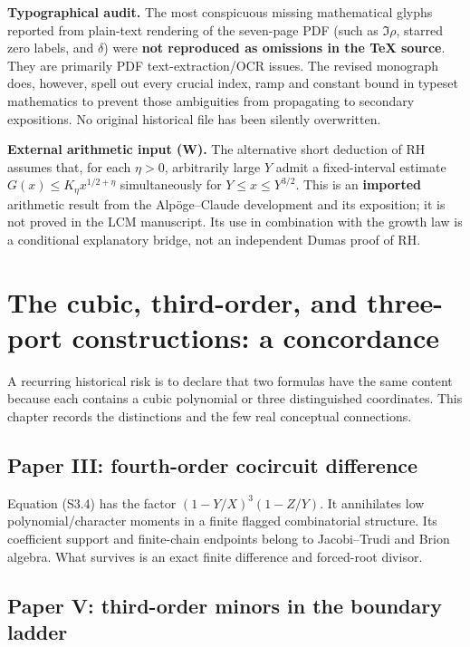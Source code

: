\documentclass[
  10pt,
  a4paper,
  10pt,
  oneside,
  openany]{book}
\begin{document}
\textbf{Typographical audit.} The most conspicuous missing mathematical
glyphs reported from plain-text rendering of the seven-page PDF (such as
\(\Im\rho\), starred zero labels, and \(\delta\)) were \textbf{not
reproduced as omissions in the TeX source}. They are primarily PDF
text-extraction/OCR issues. The revised monograph does, however, spell
out every crucial index, ramp and constant bound in typeset mathematics
to prevent those ambiguities from propagating to secondary expositions.
No original historical file has been silently overwritten.

\textbf{External arithmetic input (W).} The alternative short deduction
of RH assumes that, for each \(\eta>0\), arbitrarily large \(Y\) admit a
fixed-interval estimate \(G(x)\le K_\eta x^{1/2+\eta}\) simultaneously
for \(Y\le x\le Y^{3/2}\). This is an \textbf{imported} arithmetic
result from the Alpöge--Claude development and its exposition; it is not
proved in the LCM manuscript. Its use in combination with the growth law
is a conditional explanatory bridge, not an independent Dumas proof of
RH.

\section{The cubic, third-order, and three-port constructions: a
concordance}\label{the-cubic-third-order-and-three-port-constructions-a-concordance}

A recurring historical risk is to declare that two formulas have the
same content because each contains a cubic polynomial or three
distinguished coordinates. This chapter records the distinctions and the
few real conceptual connections.

\subsection{Paper III: fourth-order cocircuit
difference}\label{paper-iii-fourth-order-cocircuit-difference}

Equation (S3.4) has the factor \((1-Y/X)^3(1-Z/Y)\). It annihilates low
polynomial/character moments in a finite flagged combinatorial
structure. Its coefficient support and finite-chain endpoints belong to
Jacobi--Trudi and Brion algebra. What survives is an exact finite
difference and forced-root divisor.

\subsection{Paper V: third-order minors in the boundary
ladder}\label{paper-v-third-order-minors-in-the-boundary-ladder}
\end{document}
